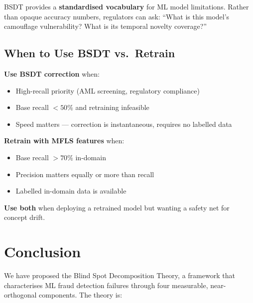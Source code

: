 \documentclass[journal]{IEEEtran}
\begin{document}
BSDT provides a \textbf{standardised vocabulary} for ML model limitations. Rather than opaque accuracy numbers, regulators can ask: ``What is this model's camouflage vulnerability? What is its temporal novelty coverage?''

\subsection{When to Use BSDT vs.\ Retrain}

\textbf{Use BSDT correction} when:
\begin{itemize}
  \item High-recall priority (AML screening, regulatory compliance)
  \item Base recall $<50\%$ and retraining infeasible
  \item Speed matters --- correction is instantaneous, requires no labelled data
\end{itemize}

\textbf{Retrain with MFLS features} when:
\begin{itemize}
  \item Base recall $>70\%$ in-domain
  \item Precision matters equally or more than recall
  \item Labelled in-domain data is available
\end{itemize}

\textbf{Use both} when deploying a retrained model but wanting a safety net for concept drift.

\section{Conclusion}
\label{sec:conclusion}

We have proposed the Blind Spot Decomposition Theory, a framework that characterises ML fraud detection failures through four measurable, near-orthogonal components. The theory is:
\end{document}
